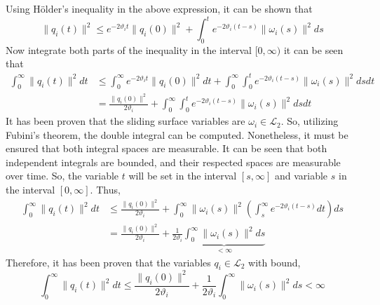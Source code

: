     Using Hölder's inequality in the above expression, it can be shown that
    \begin{equation*}
        \lVert q_i(t) \rVert^2  \leq e^{-2\vartheta_i t} \lVert q_i(0) \rVert^2 + \int_{0}^{t} e^{-2\vartheta_i (t - s)} \lVert \omega_i (s) \rVert^2 ds
    \end{equation*}
    Now integrate both parts of the inequality in the interval $[0,\infty)$ it can be seen that
    \begin{equation*}
        \begin{align}
            \int_{0}^{\infty} \lVert q_i(t) \rVert^2 dt & \leq \int_{0}^{\infty} e^{-2\vartheta_i t} \lVert q_i(0) \rVert^2 dt + \int_{0}^{\infty} \int_{0}^{t} e^{-2\vartheta_i (t - s)} \lVert \omega_i (s) \rVert^2 ds dt\\
            &= \frac{\lVert q_i(0) \rVert^2}{2\vartheta_i} + \int_{0}^{\infty} \int_{0}^{t} e^{-2\vartheta_i (t - s)} \lVert \omega_i (s) \rVert^2 ds dt
        \end{align}
    \end{equation*}
    It has been proven that the sliding surface variables are $\omega_i \in \mathcal{L}_2$. So, utilizing Fubini's theorem, the double integral can be computed. Nonetheless, it must be ensured that both integral spaces are measurable. It can be seen that both independent integrals are bounded, and their respected spaces are measurable over time. So, the variable $t$ will be set in the interval $[s, \infty]$ and variable $s$ in the interval $[0, \infty]$. Thus,
    \begin{equation*}
        \begin{align*}
            \int_{0}^{\infty} \lVert q_i(t) \rVert^2 dt & \leq \frac{\lVert q_i(0) \rVert^2}{2\vartheta_i} + \int_{0}^{\infty} \lVert \omega_i (s) \rVert^2 \left( \int_{s}^{\infty} e^{-2\vartheta_i (t - s)}dt\right) ds\\
            &= \frac{\lVert q_i(0) \rVert^2}{2\vartheta_i} + \frac{1}{2\vartheta_i}\underbrace{\int_{0}^{\infty} \lVert \omega_i (s) \rVert^2 ds}_{<\infty}
        \end{align*}
    \end{equation*}
    Therefore, it has been proven that the variables $q_i \in \mathcal{L}_2$ with bound,
    \begin{equation}\label{eq:4.2.12}
        \int_{0}^{\infty} \lVert q_i(t) \rVert^2 dt \leq \frac{\lVert q_i(0) \rVert^2}{2\vartheta_i} + \frac{1}{2\vartheta_i} \int_{0}^{\infty} \lVert \omega_i (s) \rVert^2 ds < \infty
    \end{equation}
